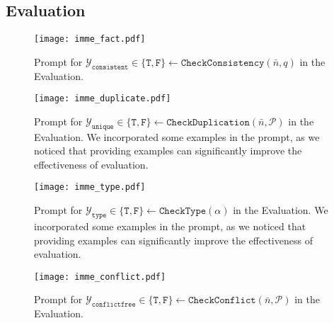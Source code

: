 \documentclass{article}
\begin{document}
\begin{appendices}
\subsection{Evaluation}
\begin{figure}[H]
    \centering
    \texttt{[image: imme\_fact.pdf]}
    \caption{Prompt for $\mathcal{Y}_\texttt{consistent} \in \{\texttt{T}, \texttt{F}\} \leftarrow \texttt{CheckConsistency}(\bar{n}, q)$ in the Evaluation.
    }
    \label{prompt 5: consistency}
\end{figure}

\begin{figure}[H]
    \centering
    \texttt{[image: imme\_duplicate.pdf]}
    \caption{Prompt for $ \mathcal{Y}_{\texttt{unique}} \in \{\texttt{T}, \texttt{F}\} \leftarrow \texttt{CheckDuplication}(\bar{n}, \mathcal{P})$ in the Evaluation. We incorporated some examples in the prompt, as we noticed that providing examples can significantly improve the effectiveness of evaluation.
    }
    \label{prompt 6: duplicate}
\end{figure}

\begin{figure}[H]
    \centering
    \texttt{[image: imme\_type.pdf]}
    \caption{Prompt for $\mathcal{Y}_{\texttt{type}} \in \{\texttt{T}, \texttt{F}\} \leftarrow \texttt{CheckType}(\alpha)$ in the Evaluation. We incorporated some examples in the prompt, as we noticed that providing examples can significantly improve the effectiveness of evaluation.
    }
    \label{prompt 7: type}
\end{figure}

\begin{figure}[H]
    \centering
    \texttt{[image: imme\_conflict.pdf]}
    \caption{Prompt for $\mathcal{Y}_{\texttt{conflictfree}} \in \{\texttt{T}, \texttt{F}\} \leftarrow \texttt{CheckConflict}(\bar{n}, \mathcal{P})$ in the Evaluation.
    }
    \label{prompt 8: conflict}
\end{figure}


\end{appendices}
\end{document}
